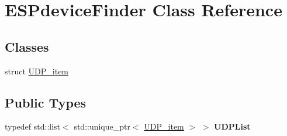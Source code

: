 \hypertarget{class_e_s_pdevice_finder}{}\section{E\+S\+Pdevice\+Finder Class Reference}
\label{class_e_s_pdevice_finder}
\subsection*{Classes}
\begin{DoxyCompactItemize}
\item 
struct \hyperlink{struct_e_s_pdevice_finder_1_1_u_d_p__item}{U\+D\+P\+\_\+item}
\end{DoxyCompactItemize}
\subsection*{Public Types}
\begin{DoxyCompactItemize}
\item 
\mbox{\label{class_e_s_pdevice_finder_a200ecda9bb2d679f4b5d6f99fa76c7ab}} 
typedef std\+::list$<$ std\+::unique\+\_\+ptr$<$ \hyperlink{struct_e_s_pdevice_finder_1_1_u_d_p__item}{U\+D\+P\+\_\+item} $>$ $>$ {\bfseries U\+D\+P\+List}
\end{DoxyCompactItemize}
